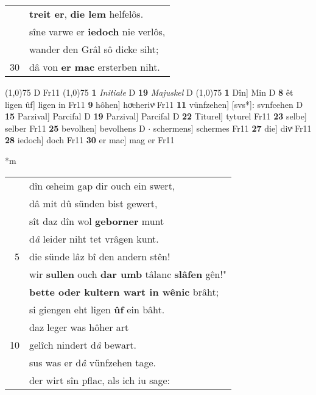 \documentclass[8pt,a4paper,notitlepage]{article}
\begin{document}
\begin{table}[ht]
\begin{minipage}[t]{0.5\linewidth}
\begin{tabular}{rl}
 & \textbf{treit er}, \textbf{die lem} helfelôs.\\ 
 & sîne varwe er \textbf{iedoch} nie verlôs,\\ 
 & wander den Grâl sô dicke siht;\\ 
30 & dâ von \textbf{er mac} ersterben niht.\\ 
\end{tabular}
\scriptsize
\line(1,0){75} \newline
D Fr11 \newline
\line(1,0){75} \newline
\textbf{1} \textit{Initiale} D  \textbf{19} \textit{Majuskel} D  \newline
\line(1,0){75} \newline
\textbf{1} Dîn] Min D \textbf{8} êt ligen ûf] ligen in Fr11 \textbf{9} hôhen] hoͯcherivͯ Fr11 \textbf{11} vünfzehen] [svs*]: svnfcehen D \textbf{15} Parzival] Parcifal D \textbf{19} Parzival] Parcifal D \textbf{22} Titurel] tyturel Fr11 \textbf{23} selbe] selber Fr11 \textbf{25} bevolhen] bevolhens D  $\cdot$ schermens] schermes Fr11 \textbf{27} die] divͯ Fr11 \textbf{28} iedoch] doch Fr11 \textbf{30} er mac] mag er Fr11 \newline
\end{minipage}
\hspace{0.5cm}
\begin{minipage}[t]{0.5\linewidth}
\small
\begin{center}*m
\end{center}
\begin{tabular}{rl}
 & dîn œheim gap dir ouch ein swert,\\ 
 & dâ mit dû sünden bist gewert,\\ 
 & sît daz dîn wol \textbf{geborner} munt\\ 
 & d\textit{â} leider niht tet vrâgen kunt.\\ 
5 & die sünde lâz bî den andern stên!\\ 
 & wir \textbf{sullen} ouch \textbf{dar umb} tâlanc \textbf{slâfen} gên!"\\ 
 & \textbf{bette oder kultern wart in wênic} brâht;\\ 
 & si giengen eht ligen \textbf{ûf} ein bâht.\\ 
 & daz leger was hôher art\\ 
10 & gelîch nindert d\textit{â} bewart.\\ 
 & sus was er d\textit{â} vünfzehen tage.\\ 
 & der wirt sîn pflac, als ich iu sage:\\ 

\end{tabular}
\end{minipage}
\end{table}
\end{document}
